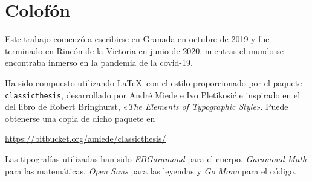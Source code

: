 \pagestyle{empty}

\hfill

\vfill


\section*{Colofón}
Este trabajo comenzó a escribirse en Granada en octubre de 2019 y fue terminado en Rincón de la Victoria en junio de 2020, mientras el mundo se encontraba inmerso en la pandemia de la covid-19.

Ha sido compuesto utilizando \LaTeX\ con el estilo proporcionado por el paquete \texttt{classicthesis}, desarrollado por André Miede e Ivo Pletikosić e inspirado en el del libro de Robert Bringhurst, «\emph{The Elements of Typographic Style}».
Puede obtenerse una copia de dicho paquete en
\begin{center}
\url{https://bitbucket.org/amiede/classicthesis/}
\end{center}
Las tipografías utilizadas han sido \emph{EBGaramond} para el cuerpo, \emph{Garamond Math} para las matemáticas, \emph{Open Sans} para las leyendas y \emph{Go Mono} para el código.
\bigskip